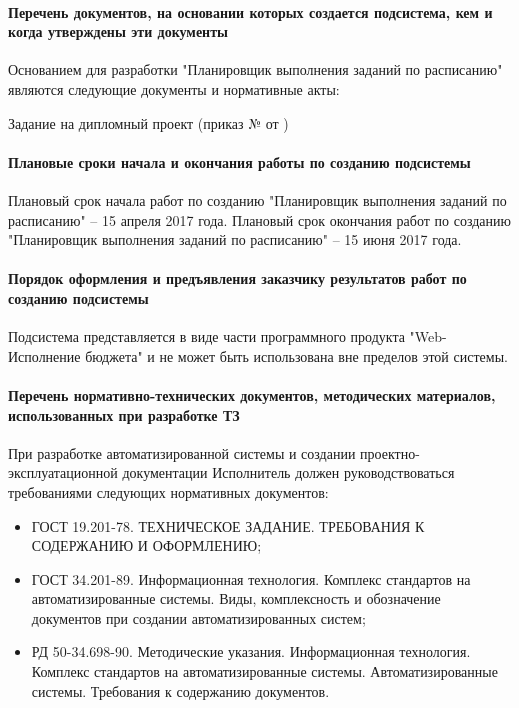 \documentclass[a4paper]{extarticle}
\begin{document}
\paragraph{Перечень документов, на основании которых создается подсистема, кем и когда утверждены эти документы}
Основанием для разработки "Планировщик выполнения заданий по расписанию" являются следующие документы и нормативные акты:\par
Задание на дипломный проект (приказ №    от    )

\paragraph{Плановые сроки начала и окончания работы по созданию подсистемы}
Плановый срок начала работ по созданию "Планировщик выполнения заданий по расписанию" – 15 апреля 2017 года. Плановый срок окончания работ по созданию "Планировщик выполнения заданий по расписанию" – 15 июня 2017 года.

\paragraph{Порядок оформления и предъявления заказчику результатов работ по созданию подсистемы}
Подсистема представляется в виде части программного продукта "Web-Исполнение бюджета" и не может быть использована вне пределов этой системы.

\paragraph{Перечень нормативно-технических документов, методических материалов, использованных при разработке ТЗ}
При разработке автоматизированной системы и создании проектно-эксплуатационной документации Исполнитель должен руководствоваться требованиями следующих нормативных документов:
\begin{itemize}
  \item ГОСТ 19.201-78. ТЕХНИЧЕСКОЕ ЗАДАНИЕ. ТРЕБОВАНИЯ К СОДЕРЖАНИЮ И ОФОРМЛЕНИЮ;
  \item ГОСТ 34.201-89. Информационная технология. Комплекс стандартов на автоматизированные системы. Виды, комплексность и обозначение документов при создании автоматизированных систем;
  \item РД 50-34.698-90. Методические указания. Информационная технология. Комплекс стандартов на автоматизированные системы. Автоматизированные системы. Требования к содержанию документов.
\end{itemize}
\end{document}
